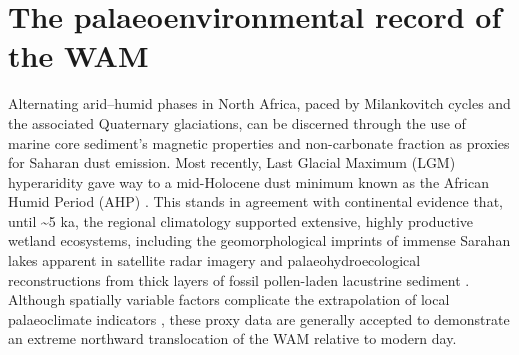 \documentclass[a4paper]{article}
\begin{document}
\section{The palaeoenvironmental record of the WAM}

Alternating arid--humid phases in North Africa, paced by Milankovitch cycles and the associated Quaternary glaciations, can be discerned through the use of marine core sediment's magnetic properties \parencite{bloemendal1989evidence, larrasoana2003three} and non-carbonate fraction \parencite{tiedemann1989climatic, tiedemann1994astronomic} as proxies for Saharan dust emission.
Most recently, Last Glacial Maximum (LGM) hyperaridity gave way to a mid-Holocene dust minimum known as the African Humid Period (AHP) \parencite{rea1994paleoclimatic, demenocal2000abrupt, adkins2006african}.
This stands in agreement with continental evidence that, until \textasciitilde 5 ka, the regional climatology supported extensive, highly productive wetland ecosystems, including the geomorphological imprints of immense Sarahan lakes apparent in satellite radar imagery \parencite{schuster2005holocene, drake2006shorelines} and palaeohydroecological reconstructions from thick layers of fossil pollen-laden lacustrine sediment \parencite{ritchie1985sediment, lezine1990across, jolly1998biome}. 
Although spatially variable factors complicate the extrapolation of local palaeoclimate indicators \parencite{baumhauer1991palaeolakes}, these proxy data are generally accepted to demonstrate an extreme northward translocation of the WAM relative to modern day.
\end{document}
